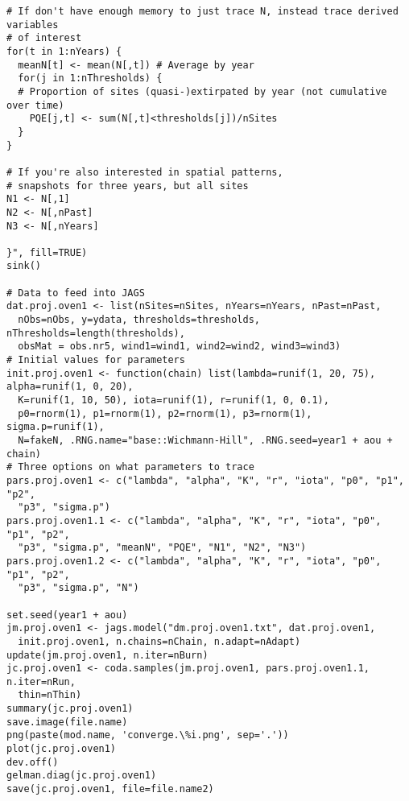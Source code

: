 \documentclass[12pt]{article}
\begin{document}
\begin{verbatim}
# If don't have enough memory to just trace N, instead trace derived variables 
# of interest
for(t in 1:nYears) { 
  meanN[t] <- mean(N[,t]) # Average by year
  for(j in 1:nThresholds) { 
  # Proportion of sites (quasi-)extirpated by year (not cumulative over time)
    PQE[j,t] <- sum(N[,t]<thresholds[j])/nSites 
  } 
}  

# If you're also interested in spatial patterns, 
# snapshots for three years, but all sites
N1 <- N[,1] 
N2 <- N[,nPast] 
N3 <- N[,nYears] 
  
}", fill=TRUE)
sink()

# Data to feed into JAGS
dat.proj.oven1 <- list(nSites=nSites, nYears=nYears, nPast=nPast, 
  nObs=nObs, y=ydata, thresholds=thresholds, nThresholds=length(thresholds),
  obsMat = obs.nr5, wind1=wind1, wind2=wind2, wind3=wind3)
# Initial values for parameters
init.proj.oven1 <- function(chain) list(lambda=runif(1, 20, 75), alpha=runif(1, 0, 20), 
  K=runif(1, 10, 50), iota=runif(1), r=runif(1, 0, 0.1), 
  p0=rnorm(1), p1=rnorm(1), p2=rnorm(1), p3=rnorm(1), sigma.p=runif(1),
  N=fakeN, .RNG.name="base::Wichmann-Hill", .RNG.seed=year1 + aou + chain)
# Three options on what parameters to trace
pars.proj.oven1 <- c("lambda", "alpha", "K", "r", "iota", "p0", "p1", "p2", 
  "p3", "sigma.p")
pars.proj.oven1.1 <- c("lambda", "alpha", "K", "r", "iota", "p0", "p1", "p2", 
  "p3", "sigma.p", "meanN", "PQE", "N1", "N2", "N3")
pars.proj.oven1.2 <- c("lambda", "alpha", "K", "r", "iota", "p0", "p1", "p2", 
  "p3", "sigma.p", "N")

set.seed(year1 + aou)
jm.proj.oven1 <- jags.model("dm.proj.oven1.txt", dat.proj.oven1, 
  init.proj.oven1, n.chains=nChain, n.adapt=nAdapt)
update(jm.proj.oven1, n.iter=nBurn)
jc.proj.oven1 <- coda.samples(jm.proj.oven1, pars.proj.oven1.1, n.iter=nRun,
  thin=nThin)
summary(jc.proj.oven1)
save.image(file.name)
png(paste(mod.name, 'converge.\%i.png', sep='.'))
plot(jc.proj.oven1)
dev.off()
gelman.diag(jc.proj.oven1)
save(jc.proj.oven1, file=file.name2)
\end{verbatim}
\end{document}

